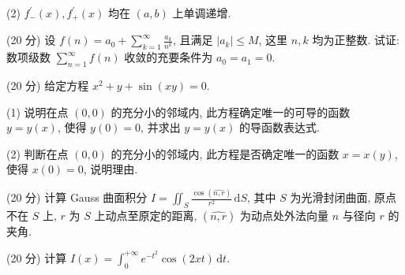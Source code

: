 (2) $f_{-}^{\prime}(x), f_{+}^{\prime}(x)$ 均在 $(a, b)$ 上单调递增.\par
\par{}
(20 分) 设 $f(n) = a_0 + \sum_{k=1}^{\infty} \frac{a_k}{n^k}$, 且满足 $|a_k| \leq M$, 这里 $n, k$ 均为正整数. 试证: 数项级数 $\sum_{n=1}^{\infty} f(n)$ 收敛的充要条件为 $a_0 = a_1 = 0$.\par
\par{}
(20 分) 给定方程 $x^{2} + y + \sin(xy) = 0$.\par
(1) 说明在点 $(0,0)$ 的充分小的邻域内, 此方程确定唯一的可导的函数 $y = y(x)$, 使得 $y(0) = 0$, 并求出 $y = y(x)$ 的导函数表达式.\par
(2) 判断在点 $(0,0)$ 的充分小的邻域内, 此方程是否确定唯一的函数 $x = x(y)$, 使得 $x(0) = 0$, 说明理由.\par
\par{}
(20 分) 计算 Gauss 曲面积分 $I = \iint_{S} \frac{\cos(\widehat{n,r})}{r^2} \, \mathrm{d}S$, 其中 $S$ 为光滑封闭曲面, 原点不在 $S$ 上, $r$ 为 $S$ 上动点至原定的距离, $(\widehat{n,r})$ 为动点处外法向量 $n$ 与径向 $r$ 的夹角.\par
\par{}
(20 分) 计算 $I(x) = \int_{0}^{+\infty} e^{-t^2} \cos(2xt) \, \mathrm{d}t$.\par
